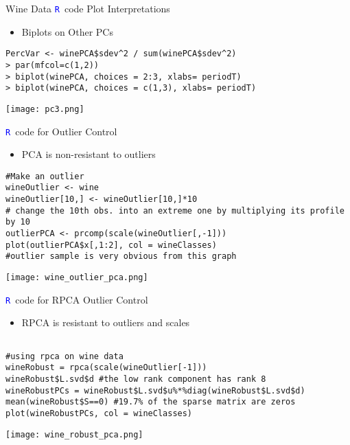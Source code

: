 \documentclass[notes=show]{beamer}
\newcommand \bit  {\begin{itemize}}
\newcommand \eit  {\end{itemize}}
\newcommand{\textR}[1]{\textcolor{blue}{\texttt{#1}}}
\newcommand{\R}{\textR{R}}
\begin{document}
\begin{frame}[fragile]{Wine Data \R \, code Plot Interpretations}

\bit
\item Biplots on Other PCs
\eit
\vspace{.25 cm}
{\tiny
\begin{Verbatim}[formatcom=\color{blue}]
PercVar <- winePCA$sdev^2 / sum(winePCA$sdev^2)
> par(mfcol=c(1,2))
> biplot(winePCA, choices = 2:3, xlabs= periodT)
> biplot(winePCA, choices = c(1,3), xlabs= periodT)
\end{Verbatim}

\vspace{-.2mm}
\texttt{[image: pc3.png]}
     
}
\end{frame}


\begin{frame}[fragile]{\R \, code for Outlier Control}

\bit
\item PCA is non-resistant to outliers
\eit
\vspace{.25 cm}
{\tiny
\begin{Verbatim}[formatcom=\color{blue}]
#Make an outlier 
wineOutlier <- wine
wineOutlier[10,] <- wineOutlier[10,]*10 
# change the 10th obs. into an extreme one by multiplying its profile by 10
outlierPCA <- prcomp(scale(wineOutlier[,-1]))
plot(outlierPCA$x[,1:2], col = wineClasses)
#outlier sample is very obvious from this graph 
\end{Verbatim}

\texttt{[image: wine\_outlier\_pca.png]}

}
\end{frame}

\begin{frame}[fragile]{\R \, code for RPCA Outlier Control}

\bit
\item RPCA is resistant to outliers and scales
\eit
\vspace{.25 cm}
{\tiny
\begin{Verbatim}[formatcom=\color{blue}]

#using rpca on wine data 
wineRobust = rpca(scale(wineOutlier[-1]))
wineRobust$L.svd$d #the low rank component has rank 8 
wineRobustPCs = wineRobust$L.svd$u%*%diag(wineRobust$L.svd$d)
mean(wineRobust$S==0) #19.7% of the sparse matrix are zeros 
plot(wineRobustPCs, col = wineClasses)
\end{Verbatim}

\texttt{[image: wine\_robust\_pca.png]}

}


\end{frame}
\end{document}
